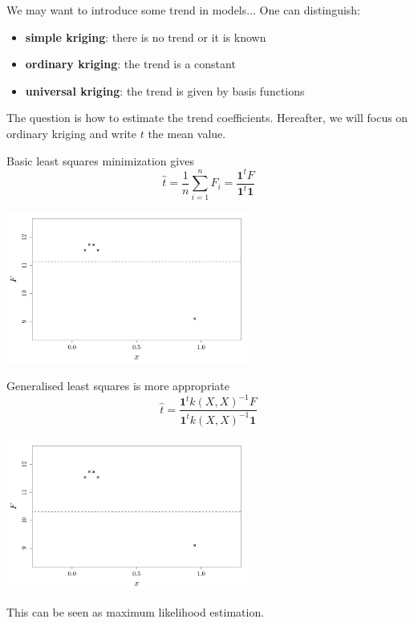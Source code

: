 \documentclass{beamer}
\begin{document}
\begin{frame}{}
We may want to introduce some trend in models... One can distinguish:
\begin{itemize}
	\item \textbf{simple kriging}: there is no trend or it is known
	\item \textbf{ordinary kriging}: the trend is a constant
	\item \textbf{universal kriging}: the trend is given by basis functions
\end{itemize}
\vspace{5mm} 
The question is how to estimate the trend coefficients. Hereafter, we will focus on ordinary kriging and write $t$ the mean value.
\end{frame}

\begin{frame}{}
Basic least squares minimization gives
$$ \displaystyle \hat{t} = \frac{1}{n} \sum_{i=1}^n F_i = \frac{\mathbf{1}^t F}{\mathbf{1}^t \mathbf{1}}$$
\begin{center}
	\includegraphics[height=5cm]{figures/trend_pbbasicordinary}
\end{center}
\end{frame}

\begin{frame}{}
Generalised least squares is more appropriate
$$ \displaystyle \hat{t} = \frac{\mathbf{1}^t k(X,X)^{-1} F}{\mathbf{1}^t k(X,X)^{-1} \mathbf{1}}$$
\begin{center}
	\includegraphics[height=5cm]{figures/trend_estimordinary}
\end{center}
This can be seen as maximum likelihood estimation.
\end{frame}
\end{document}
